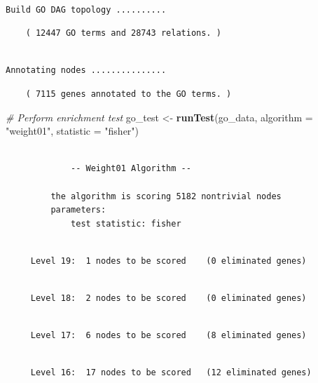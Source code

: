 \documentclass[]{article}
\newenvironment{Shaded}{\begin{snugshade}}{\end{snugshade}}
\newcommand{\KeywordTok}[1]{\textcolor[rgb]{0.13,0.29,0.53}{\textbf{#1}}}
\newcommand{\DataTypeTok}[1]{\textcolor[rgb]{0.13,0.29,0.53}{#1}}
\newcommand{\StringTok}[1]{\textcolor[rgb]{0.31,0.60,0.02}{#1}}
\newcommand{\CommentTok}[1]{\textcolor[rgb]{0.56,0.35,0.01}{\textit{#1}}}
\newcommand{\NormalTok}[1]{#1}
\begin{document}
\begin{verbatim}

Build GO DAG topology ..........
\end{verbatim}

\begin{verbatim}
    ( 12447 GO terms and 28743 relations. )
\end{verbatim}

\begin{verbatim}

Annotating nodes ...............
\end{verbatim}

\begin{verbatim}
    ( 7115 genes annotated to the GO terms. )
\end{verbatim}

\begin{Shaded}
\begin{Highlighting}[]
\CommentTok{# Perform enrichment test}
\NormalTok{go_test <-}\StringTok{ }\KeywordTok{runTest}\NormalTok{(go_data, }\DataTypeTok{algorithm =} \StringTok{"weight01"}\NormalTok{, }\DataTypeTok{statistic =} \StringTok{"fisher"}\NormalTok{)}
\end{Highlighting}
\end{Shaded}

\begin{verbatim}

             -- Weight01 Algorithm -- 

         the algorithm is scoring 5182 nontrivial nodes
         parameters: 
             test statistic: fisher
\end{verbatim}

\begin{verbatim}

     Level 19:  1 nodes to be scored    (0 eliminated genes)
\end{verbatim}

\begin{verbatim}

     Level 18:  2 nodes to be scored    (0 eliminated genes)
\end{verbatim}

\begin{verbatim}

     Level 17:  6 nodes to be scored    (8 eliminated genes)
\end{verbatim}

\begin{verbatim}

     Level 16:  17 nodes to be scored   (12 eliminated genes)
\end{verbatim}
\end{document}
